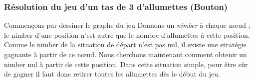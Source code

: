 \documentclass{beamer}
\begin{document}
  \begin{frame}
    \frametitle{Résolution du jeu d'un tas de 3 d'allumettes (Bouton)}
     {Commençons par dessiner le graphe du jeu}
     {Donnons un \textit{nimber} à chaque nœud ;}
     {\alert{le nimber d'une position n'est autre que le nombre d'allumettes à cette position.}}
     {Comme le nimber de la situation de départ n'est pas nul, il existe une stratégie gagnante à partir de ce nœud.}
     {Nous cherchons maintenant comment obtenir un nimber nul à partir de cette position.}
     {Dans cette situation simple, pour être sûr de gagner il faut donc retirer toutes les allumettes dès le début du jeu.}

     {
      \begin{figure}[h]
        \centering
      \end{figure}
    }
  \end{frame}
\end{document}

